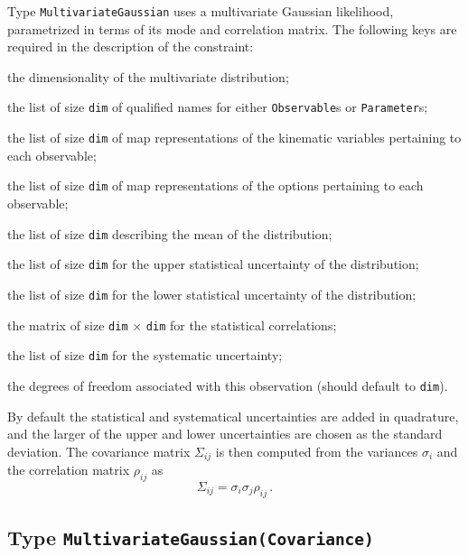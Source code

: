 Type \texttt{MultivariateGaussian} uses a multivariate Gaussian likelihood,
parametrized in terms of its mode and correlation matrix. The following keys
are required in the description of the constraint:
\begin{description}[labelwidth=.15\textwidth]
    \item[\texttt{dim}] the dimensionality of the multivariate distribution;
    \item[\texttt{observables}] the list of size \texttt{dim} of qualified names for either \texttt{Observable}s or \texttt{Parameter}s;
    \item[\texttt{kinematics}] the list of size \texttt{dim} of map representations of the kinematic variables pertaining to each observable;
    \item[\texttt{options}] the list of size \texttt{dim} of map representations of the options pertaining to each observable;
    \item[\texttt{means}] the list of size \texttt{dim} describing the mean of the distribution;
    \item[\texttt{sigma-stat-hi}] the list of size \texttt{dim} for the upper statistical uncertainty of the distribution;
    \item[\texttt{sigma-stat-lo}] the list of size \texttt{dim} for the lower statistical uncertainty of the distribution;
    \item[\texttt{correlations}] the matrix of size \texttt{dim} $\times$ \texttt{dim} for the statistical correlations;
    \item[\texttt{sigma-sys}] the list of size \texttt{dim} for the systematic uncertainty;
    \item[\texttt{dof}] the degrees of freedom associated with this observation (should default to \texttt{dim}).
\end{description}
By default the statistical and systematical uncertainties are added in
quadrature, and the larger of the upper and lower uncertainties are chosen as
the standard deviation. The covariance matrix $\Sigma_{ij}$ is then computed from
the variances $\sigma_i$ and the correlation matrix $\rho_{ij}$ as
\begin{equation}
    \Sigma_{ij} = \sigma_i \sigma_j \rho_{ij}\,.
\end{equation}

\subsection{Type \texttt{MultivariateGaussian(Covariance)}}

